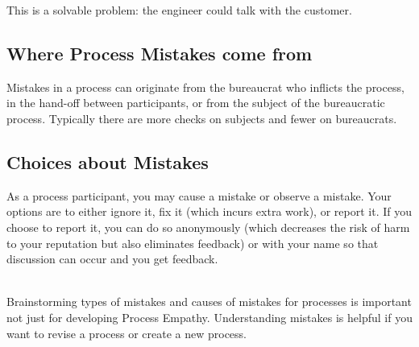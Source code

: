This is a solvable problem: the engineer could talk with the customer. 



\subsection*{Where Process Mistakes come from}
Mistakes in a process can originate from the bureaucrat who inflicts the process, in the hand-off between participants, or from the \gls{subject} of the bureaucratic process. Typically there are more checks on subjects and fewer on bureaucrats. 

\subsection*{Choices about Mistakes}
As a process participant, you may cause a mistake or observe a mistake. Your options are to either ignore it, fix it (which incurs extra work), or report it. If you choose to report it, you can do so anonymously (which decreases the risk of harm to your reputation but also eliminates feedback) or with your name so that discussion can occur and you get feedback.

\ \\

Brainstorming types of mistakes and causes of mistakes for processes is important not just for developing Process Empathy. Understanding mistakes is helpful if you want to revise a process or create a new process.